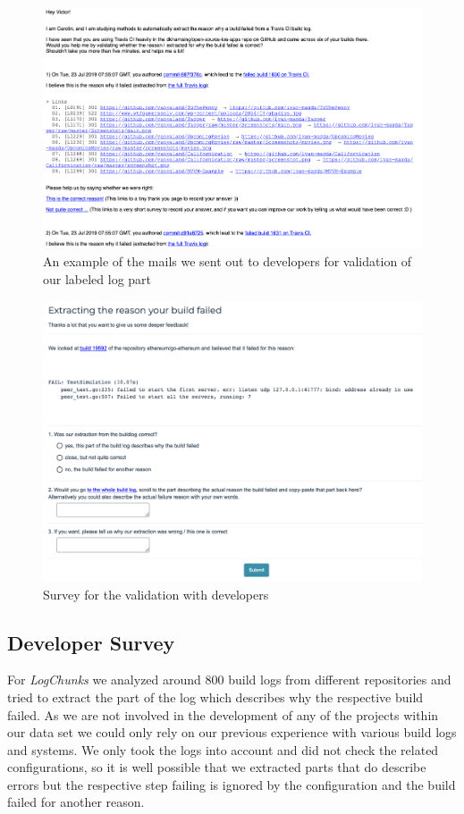 \documentclass[\myrootdir/main.tex]{subfiles}
\begin{document}
\begin{figure}[h]
	\centering
	\includegraphics[width=\textwidth, clip]{img/dev-mail.png}
	\caption{An example of the mails we sent out to developers for validation of our labeled log part}
	\label{fig:dev-mail}
\end{figure}
\begin{figure}[h]
	\centering
	\includegraphics[width=\textwidth, clip]{img/dev-survey.png}
	\caption{Survey for the validation with developers}
	\label{fig:dev-survey}
\end{figure}

\subsection{Developer Survey}
For \emph{LogChunks} we analyzed around 800 build logs from different repositories and tried to extract the part of the log which describes why the respective build failed.
As we are not involved in the development of any of the projects within our data set we could only rely on our previous experience with various build logs and systems.
We only took the logs into account and did not check the related configurations, so it is well possible that we extracted parts that do describe errors but the respective step failing is ignored by the configuration and the build failed for another reason.
\end{document}
